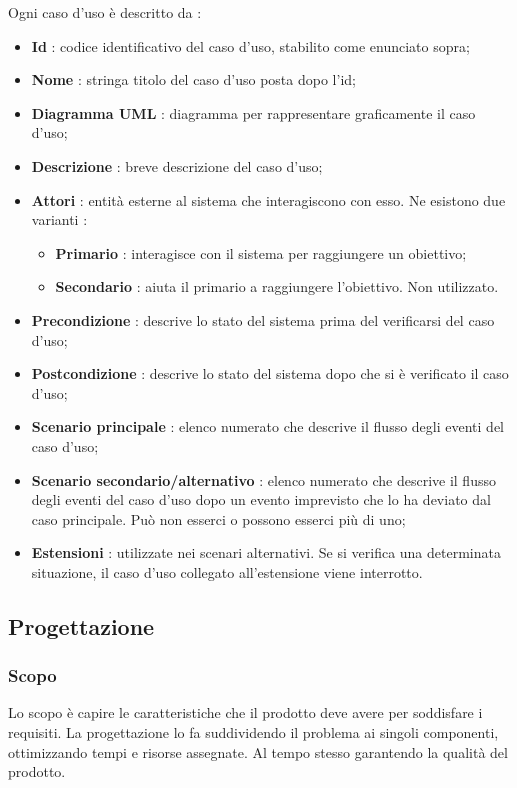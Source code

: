 Ogni caso d'uso è descritto da : 
\begin{itemize}
    \item \textbf{Id} : codice identificativo del caso d'uso, stabilito come enunciato sopra;
    \item \textbf{Nome} : stringa titolo del caso d'uso posta dopo l'id;
    \item \textbf{Diagramma UML} : diagramma per rappresentare graficamente il caso d'uso;
    \item \textbf{Descrizione} : breve descrizione del caso d'uso;
    \item \textbf{Attori} : entità esterne al sistema che interagiscono con esso. Ne esistono due varianti : 
    \begin{itemize}
    \item \textbf{Primario} : interagisce con il sistema per raggiungere un obiettivo;
    \item \textbf{Secondario} : aiuta il primario a raggiungere l'obiettivo. Non utilizzato.
    \end{itemize}
    \item \textbf{Precondizione} : descrive lo stato del sistema prima del verificarsi del caso d'uso;
    \item \textbf{Postcondizione} : descrive lo stato del sistema dopo che si è verificato il caso d'uso;
    \item \textbf{Scenario principale} : elenco numerato che descrive il flusso degli eventi del caso d'uso;
    \item \textbf{Scenario secondario/alternativo} : elenco numerato che descrive il flusso degli eventi del caso d'uso dopo un evento imprevisto che lo ha deviato dal caso principale. Può non esserci o possono esserci più di uno;
    \item \textbf{Estensioni} : utilizzate nei scenari alternativi. Se si verifica una determinata situazione, il caso d'uso collegato all'estensione viene interrotto.
\end{itemize}





\subsection{Progettazione}
\subsubsection{Scopo}
Lo scopo è capire le caratteristiche che il prodotto deve avere per soddisfare i requisiti. La progettazione lo fa suddividendo il problema ai singoli componenti, ottimizzando tempi e risorse assegnate. Al tempo stesso garantendo la qualità del prodotto.

